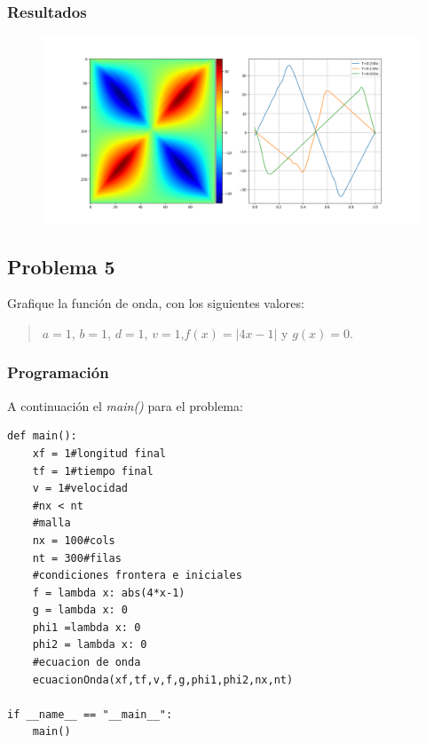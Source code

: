 \documentclass[a4paper,12pt]{article}
\newcommand{\eq}[1]{$#1$}
\begin{document}
    \subsubsection{Resultados}
    \begin{figure}[h]
        \centering
        \includegraphics[width=\textwidth]{graph4.png}
    \end{figure}

    \subsection{Problema 5}
    Grafique la función de onda, con los siguientes valores:
    \begin{quote}
        \centering
        \eq{a = 1}, \eq{b = 1}, \eq{d = 1}, \eq{v = 1},\eq{f(x) = |4x - 1|} y \eq{g(x) = 0}.
    \end{quote}
    \subsubsection{Programación}
    A continuación el \emph{main()} para el problema:

\begin{lstlisting}[frame=single]
def main():
    xf = 1#longitud final
    tf = 1#tiempo final
    v = 1#velocidad 
    #nx < nt
    #malla
    nx = 100#cols
    nt = 300#filas
    #condiciones frontera e iniciales
    f = lambda x: abs(4*x-1)
    g = lambda x: 0
    phi1 =lambda x: 0
    phi2 = lambda x: 0
    #ecuacion de onda
    ecuacionOnda(xf,tf,v,f,g,phi1,phi2,nx,nt)

if __name__ == "__main__":
    main()
\end{lstlisting}
\end{document}
